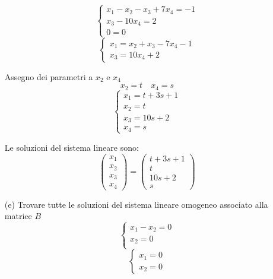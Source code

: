 \documentclass[a4paper]{article}
\theoremstyle{break}
\theoremstyle{break}
\theoremstyle{break}
\theoremstyle{break}
\begin{document}
\begin{enumerate}
	      \vspace{1em}
	      \[
		      \begin{cases}
			      x_1 - x_2 - x_3 +7x_4 = -1 \\
			      x_3 - 10x_4 = 2            \\
			      0 = 0
		      \end{cases}
	      \]
	      \[
		      \begin{cases}
			      x_1 = x_2 + x_3 - 7x_4 - 1 \\
			      x_3 = 10x_4 + 2
		      \end{cases}
	      \]

	      Assegno dei parametri a \( x_2 \) e \( x_4 \)
	      \[
		      x_2 = t \quad x_4 = s
	      \]
	      \[
		      \begin{cases}
			      x_1 = t + 3s +1 \\
			      x_2 = t         \\
			      x_3 = 10s + 2   \\
			      x_4 = s
		      \end{cases}
	      \]

	      Le soluzioni del sistema lineare sono:
	      \[
		      \begin{pmatrix}
			      x_1 \\
			      x_2 \\
			      x_3 \\
			      x_4
		      \end{pmatrix}
		      =
		      \begin{pmatrix}
			      t + 3s + 1 \\
			      t          \\
			      10s + 2    \\
			      s
		      \end{pmatrix}
	      \]

	\item[(e)] Trovare tutte le soluzioni del sistema lineare omogeneo associato alla
	      matrice \( B \)
	      \[
		      \begin{cases}
			      x_1 - x_2 = 0 \\
			      x_2 = 0       \\
		      \end{cases}
	      \]
	      \[
		      \begin{cases}
			      x_1 = 0 \\
			      x_2 = 0
		      \end{cases}
	      \]
\end{enumerate}
\end{document}
